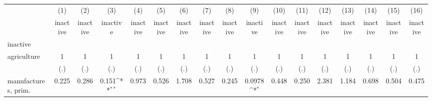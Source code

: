 {
\def\sym#1{\ifmmode^{#1}\else\(^{#1}\)\fi}
\begin{tabular}{l*{16}{c}}
\hline\hline
                    &\multicolumn{1}{c}{(1)}&\multicolumn{1}{c}{(2)}&\multicolumn{1}{c}{(3)}&\multicolumn{1}{c}{(4)}&\multicolumn{1}{c}{(5)}&\multicolumn{1}{c}{(6)}&\multicolumn{1}{c}{(7)}&\multicolumn{1}{c}{(8)}&\multicolumn{1}{c}{(9)}&\multicolumn{1}{c}{(10)}&\multicolumn{1}{c}{(11)}&\multicolumn{1}{c}{(12)}&\multicolumn{1}{c}{(13)}&\multicolumn{1}{c}{(14)}&\multicolumn{1}{c}{(15)}&\multicolumn{1}{c}{(16)}\\
                    &\multicolumn{1}{c}{inactive}&\multicolumn{1}{c}{inactive}&\multicolumn{1}{c}{inactive}&\multicolumn{1}{c}{inactive}&\multicolumn{1}{c}{inactive}&\multicolumn{1}{c}{inactive}&\multicolumn{1}{c}{inactive}&\multicolumn{1}{c}{inactive}&\multicolumn{1}{c}{inactive}&\multicolumn{1}{c}{inactive}&\multicolumn{1}{c}{inactive}&\multicolumn{1}{c}{inactive}&\multicolumn{1}{c}{inactive}&\multicolumn{1}{c}{inactive}&\multicolumn{1}{c}{inactive}&\multicolumn{1}{c}{inactive}\\
\hline
inactive            &                     &                     &                     &                     &                     &                     &                     &                     &                     &                     &                     &                     &                     &                     &                     &                     \\
agriculture         &           1         &           1         &           1         &           1         &           1         &           1         &           1         &           1         &           1         &           1         &           1         &           1         &           1         &           1         &           1         &           1         \\
                    &         (.)         &         (.)         &         (.)         &         (.)         &         (.)         &         (.)         &         (.)         &         (.)         &         (.)         &         (.)         &         (.)         &         (.)         &         (.)         &         (.)         &         (.)         &         (.)         \\
[1em]
manufactures, prim. &       0.225         &       0.286         &       0.151\sym{**} &       0.973         &       0.526         &       1.708         &       0.527         &       0.245         &      0.0978\sym{*}  &       0.448         &       0.250         &       2.381         &       1.184         &       0.698         &       0.504         &       0.475         \\

\end{tabular}}
